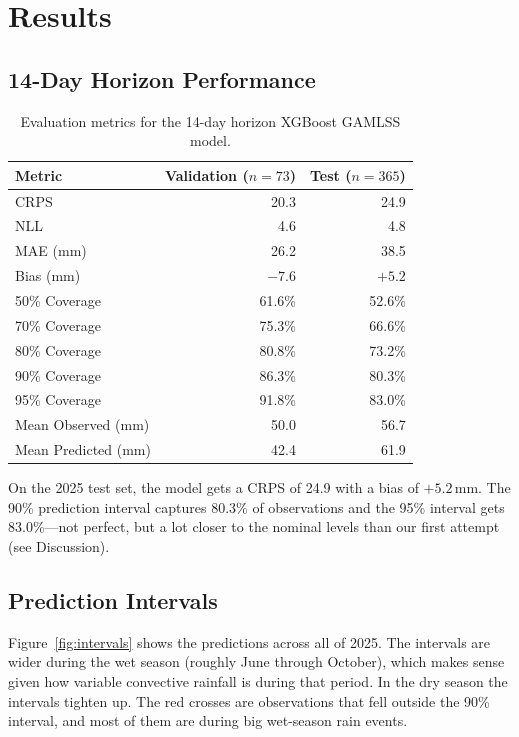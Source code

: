 \documentclass[11pt]{article}
\begin{document}
\section{Results}

\subsection{14-Day Horizon Performance}

\begin{table}[H]
\centering
\begin{tabular}{@{}lrr@{}}
\toprule
\textbf{Metric} & \textbf{Validation} ($n=73$) & \textbf{Test} ($n=365$) \\
\midrule
CRPS & 20.3 & 24.9 \\
NLL & 4.6 & 4.8 \\
MAE (mm) & 26.2 & 38.5 \\
Bias (mm) & $-7.6$ & $+5.2$ \\
50\% Coverage & 61.6\% & 52.6\% \\
70\% Coverage & 75.3\% & 66.6\% \\
80\% Coverage & 80.8\% & 73.2\% \\
90\% Coverage & 86.3\% & 80.3\% \\
95\% Coverage & 91.8\% & 83.0\% \\
Mean Observed (mm) & 50.0 & 56.7 \\
Mean Predicted (mm) & 42.4 & 61.9 \\
\bottomrule
\end{tabular}
\caption{Evaluation metrics for the 14-day horizon XGBoost GAMLSS model.}
\label{tab:results}
\end{table}

On the 2025 test set, the model gets a CRPS of 24.9 with a bias of $+5.2$\,mm. The 90\% prediction interval captures 80.3\% of observations and the 95\% interval gets 83.0\%---not perfect, but a lot closer to the nominal levels than our first attempt (see Discussion).

\subsection{Prediction Intervals}

Figure~\ref{fig:intervals} shows the predictions across all of 2025. The intervals are wider during the wet season (roughly June through October), which makes sense given how variable convective rainfall is during that period. In the dry season the intervals tighten up. The red crosses are observations that fell outside the 90\% interval, and most of them are during big wet-season rain events.
\end{document}
